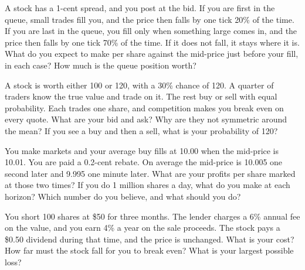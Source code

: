 \begin{question}\label{iq:iv2:markets-and-microstructure:18}
A stock has a 1-cent spread, and you post at the bid. If you are first in the queue, small trades fill you, and the price then falls by one tick 20\% of the time. If you are last in the queue, you fill only when something large comes in, and the price then falls by one tick 70\% of the time. If it does not fall, it stays where it is. What do you expect to make per share against the mid-price just before your fill, in each case? How much is the queue position worth?
\end{question}

\begin{question}\label{iq:iv2:markets-and-microstructure:19}
A stock is worth either 100 or 120, with a 30\% chance of 120. A quarter of traders know the true value and trade on it. The rest buy or sell with equal probability. Each trades one share, and competition makes you break even on every quote. What are your bid and ask? Why are they not symmetric around the mean? If you see a buy and then a sell, what is your probability of 120?
\end{question}

\begin{question}\label{iq:iv2:markets-and-microstructure:20}
You make markets and your average buy fills at 10.00 when the mid-price is 10.01. You are paid a 0.2-cent rebate. On average the mid-price is 10.005 one second later and 9.995 one minute later. What are your profits per share marked at those two times? If you do 1 million shares a day, what do you make at each horizon? Which number do you believe, and what should you do?
\end{question}

\begin{question}\label{iq:iv2:markets-and-microstructure:21}
You short 100 shares at \$50 for three months. The lender charges a 6\% annual fee on the value, and you earn 4\% a year on the sale proceeds. The stock pays a \$0.50 dividend during that time, and the price is unchanged. What is your cost? How far must the stock fall for you to break even? What is your largest possible loss?
\end{question}

